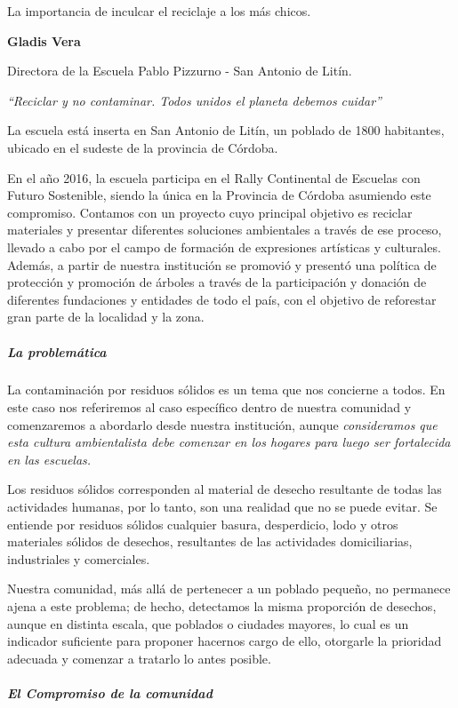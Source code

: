 \documentclass[
]{article}
\begin{document}
La importancia de inculcar el reciclaje a los más chicos.

\textbf{Gladis Vera}

Directora de la Escuela Pablo Pizzurno - San Antonio de Litín.

\emph{``Reciclar y no contaminar. Todos unidos el planeta debemos
cuidar''}

La escuela está inserta en San Antonio de Litín, un poblado de 1800
habitantes, ubicado en el sudeste de la provincia de Córdoba.

En el año 2016, la escuela participa en el Rally Continental de Escuelas
con Futuro Sostenible, siendo la única en la Provincia de Córdoba
asumiendo este compromiso. Contamos con un proyecto cuyo principal
objetivo es reciclar materiales y presentar diferentes soluciones
ambientales a través de ese proceso, llevado a cabo por el campo de
formación de expresiones artísticas y culturales. Además, a partir de
nuestra institución se promovió y presentó una política de protección y
promoción de árboles a través de la participación y donación de
diferentes fundaciones y entidades de todo el país, con el objetivo de
reforestar gran parte de la localidad y la zona.

\hypertarget{la-problemuxe1tica}{%
\subparagraph{La problemática}\label{la-problemuxe1tica}}

La contaminación por residuos sólidos es un tema que nos concierne a
todos. En este caso nos referiremos al caso específico dentro de nuestra
comunidad y comenzaremos a abordarlo desde nuestra institución, aunque
\emph{consideramos que esta cultura ambientalista debe comenzar en los
hogares para luego ser fortalecida en las escuelas.}

Los residuos sólidos corresponden al material de desecho resultante de
todas las actividades humanas, por lo tanto, son una realidad que no se
puede evitar. Se entiende por residuos sólidos cualquier basura,
desperdicio, lodo y otros materiales sólidos de desechos, resultantes de
las actividades domiciliarias, industriales y comerciales.

Nuestra comunidad, más allá de pertenecer a un poblado pequeño, no
permanece ajena a este problema; de hecho, detectamos la misma
proporción de desechos, aunque en distinta escala, que poblados o
ciudades mayores, lo cual es un indicador suficiente para proponer
hacernos cargo de ello, otorgarle la prioridad adecuada y comenzar a
tratarlo lo antes posible.

\hypertarget{el-compromiso-de-la-comunidad}{%
\subparagraph{El Compromiso de la
comunidad}\label{el-compromiso-de-la-comunidad}}
\end{document}
